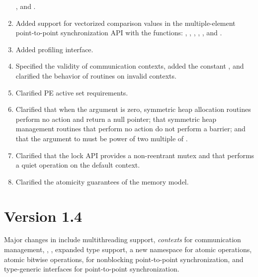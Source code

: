 \begin{enumerate}
  , and .
%
%
\item Added support for vectorized comparison values in the multiple-element
  point-to-point synchronization \ac{API} with the functions:
  , ,
  ,
  , , and
  .
%
%
\item Added \openshmem profiling interface.
%
%
\item Specified the validity of communication contexts, added the constant
  , and clarified the behavior of
   routines on invalid contexts.
%
%
\item Clarified \ac{PE} active set requirements.
%
%
\item Clarified that when the  argument is zero, symmetric heap
    allocation routines perform no action and return a null pointer; that
    symmetric heap management routines that perform no action do not perform a
    barrier; and that the  argument to  must
    be power of two multiple of .
%
%
\item Clarified that the \openshmem lock \ac{API} provides a non-reentrant mutex and
    that  performs a quiet operation on the default
    context.
%
%
\item Clarified the atomicity guarantees of the \openshmem memory model.
%
%
\end{enumerate}

\section{Version 1.4}
Major changes in \openshmem[1.4] include
multithreading support,
\emph{contexts} for communication management,
,
,
expanded type support,
a new namespace for atomic operations,
atomic bitwise operations,
 for nonblocking point-to-point synchronization,
and \Cstd[11] type-generic interfaces for point-to-point synchronization.

